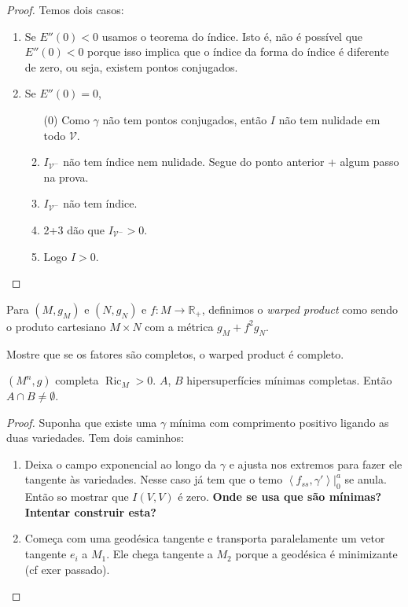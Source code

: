 \begin{proof}
Temos dois casos:
\begin{enumerate}
\item Se $E''(0)<0$ usamos o teorema do índice. Isto é, não é possível que
 $E''(0)<0$ porque isso implica que o índice da forma do índice é diferente
 de zero, ou seja, existem pontos conjugados.
\item Se $E''(0)=0$,
\begin{enumerate}
\item[(0)] Como $\gamma$ não tem pontos conjugados, então $I$ não tem
nulidade em todo  $\mathcal{V}$.
\item $I_{\mathcal{V}^-}$ não tem índice nem nulidade. Segue do ponto anterior + 
algum passo na prova.
\item $I_{\mathcal{V}^-}$ não tem índice.
\item 2+3 dão que $I_{\mathcal{V}^-}>0$.
\item Logo $I>0$.
\end{enumerate}
\end{enumerate}
\end{proof}

\begin{exercise}
\label{exercise-wraped-product}
Para $(M,g_M)$ e $(N,g_N)$ e $f:M \to \mathbb{R}_+$, definimos o {\it warped
product} como sendo o produto cartesiano $M\times N$ com a métrica 
 $g_M+f^2g_N$.

Mostre que se os fatores são completos, o warped product é completo.
\end{exercise}

\begin{exercise}
\label{exercise-intersecting-minimal-hypersurfaces}
$(M^n,g)$ completa $\operatorname{Ric}_M>0$. $A$, $B$ hipersuperfícies mínimas
completas. Então  $A \cap B \neq \emptyset$.
\end{exercise}

\begin{proof}
Suponha que existe uma $\gamma$ mínima com comprimento positivo ligando as 
duas variedades. Tem dois caminhos:
\begin{enumerate}
\item Deixa o campo exponencial ao longo da $\gamma$ e ajusta nos extremos
para fazer ele tangente às variedades. Nesse caso já tem que o temo
$\left<f_{ss},\gamma'\right>|_{0}^a$ se anula. Então so mostrar que $I(V,V)$  é
zero. {\bf Onde se usa que são mínimas? Intentar construir esta?}
\item Começa com uma geodésica tangente e transporta paralelamente um vetor
tangente $e_i$ a  $M_1$. Ele chega tangente a  $M_2$ porque a geodésica é
minimizante (cf exer passado).
\end{enumerate}
\end{proof}

